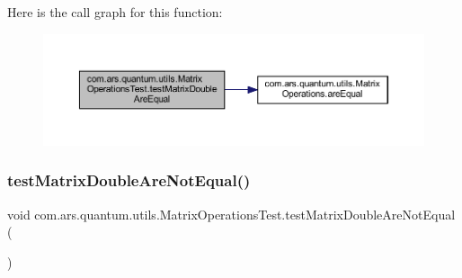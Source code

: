 Here is the call graph for this function\+:\nopagebreak
\begin{figure}[H]
\begin{center}
\leavevmode
\includegraphics[width=350pt]{classcom_1_1ars_1_1quantum_1_1utils_1_1_matrix_operations_test_a8cc1964185da3b73b5a1f4f38f0bb25d_cgraph}
\end{center}
\end{figure}
\hypertarget{classcom_1_1ars_1_1quantum_1_1utils_1_1_matrix_operations_test_ae47b404462da670081830dded82d3252}{}\label{classcom_1_1ars_1_1quantum_1_1utils_1_1_matrix_operations_test_ae47b404462da670081830dded82d3252} 
\subsubsection{\texorpdfstring{test\+Matrix\+Double\+Are\+Not\+Equal()}{testMatrixDoubleAreNotEqual()}}
{\footnotesize\ttfamily void com.\+ars.\+quantum.\+utils.\+Matrix\+Operations\+Test.\+test\+Matrix\+Double\+Are\+Not\+Equal (\begin{DoxyParamCaption}{ }\end{DoxyParamCaption})}

